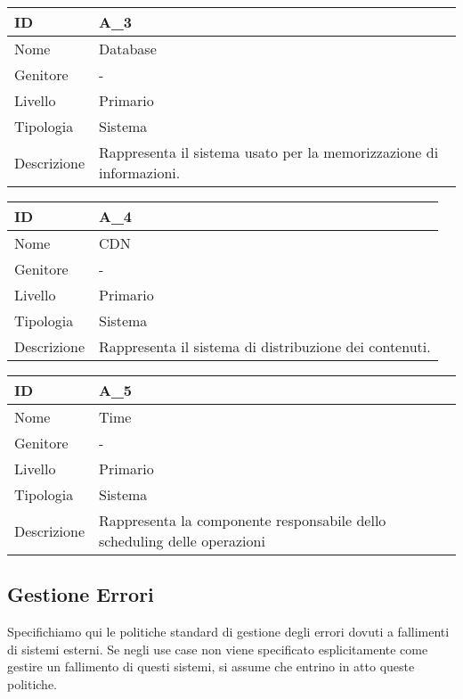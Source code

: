 \begin{center}
\begin{tabular}{ |p{2cm}|p{10cm}|  }
\hline
ID & A\_3 \\\hline
Nome & Database\\\hline
Genitore & - \\\hline
Livello &  Primario \\\hline
Tipologia & Sistema \\\hline
Descrizione &  Rappresenta il sistema usato per la memorizzazione di informazioni. \\\hline
\end{tabular}
\label{table_attore:3}\newline

\begin{tabular}{ |p{2cm}|p{10cm}|  }
\hline
ID & A\_4 \\\hline
Nome & CDN\\\hline
Genitore & - \\\hline
Livello &  Primario \\\hline
Tipologia & Sistema \\\hline
Descrizione &  Rappresenta il sistema di distribuzione dei contenuti. \\\hline
\end{tabular}
\label{table_attore:4}\newline

\begin{tabular}{ |p{2cm}|p{10cm}|  }
\hline
ID & A\_5 \\\hline
Nome & Time\\\hline
Genitore & - \\\hline
Livello &  Primario \\\hline
Tipologia & Sistema \\\hline
Descrizione &  Rappresenta la componente responsabile dello scheduling delle operazioni \\\hline
\end{tabular}
\label{table_attore:5}\newline


\end{center}

\subsection{Gestione Errori}
Specifichiamo qui le politiche standard di gestione degli errori dovuti a fallimenti di sistemi esterni. Se negli use case non viene specificato esplicitamente come gestire un fallimento di questi sistemi, si assume che entrino in atto queste politiche.


